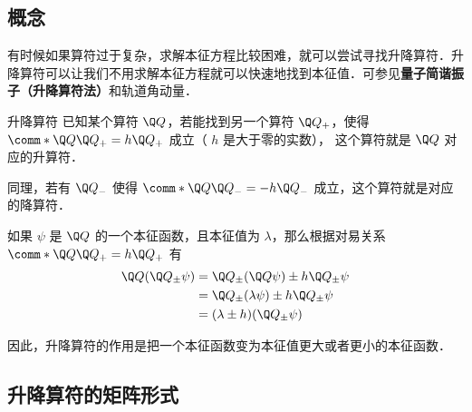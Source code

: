 
\begin{issues}
\issueDraft
\end{issues}



\subsection{概念}


有时候如果算符过于复杂，求解本征方程比较困难，就可以尝试寻找升降算符．升降算符可以让我们不用求解本征方程就可以快速地找到本征值．可参见\textbf{量子简谐振子（升降算符法）}和轨道角动量．%


\begin{definition}{升降算符}
已知某个算符 $\Q Q$，若能找到另一个算符 $\Q Q_+$，使得 $\comm*{\Q Q}{\Q Q_+} = h \Q Q_+$ 成立（ $h$ 是大于零的实数）， 这个算符就是 $\Q Q$ 对应的升算符． 

同理，若有 $\Q Q_-$ 使得 $\comm*{\Q Q}{\Q Q_-} = - h\Q Q_-$ 成立，这个算符就是对应的降算符．
\end{definition}

如果 $\psi$ 是 $\Q Q$ 的一个本征函数，且本征值为 $\lambda$，那么根据对易关系 $\comm*{\Q Q}{\Q Q_+} = h \Q Q_+$ 有
\begin{equation}\label{RLop_eq1}
\begin{aligned}
\Q Q (\Q Q_\pm \psi) &= \Q Q_\pm (\Q Q\psi) \pm h \Q Q_\pm \psi  \\
&= \Q Q_\pm (\lambda \psi) \pm h \Q Q_\pm \psi  \\
&= (\lambda  \pm h)(\Q Q_\pm \psi)
\end{aligned}
\end{equation}

因此，升降算符的作用是把一个本征函数变为本征值更大或者更小的本征函数．










\subsection{升降算符的矩阵形式}\label{RLop_sub1}

